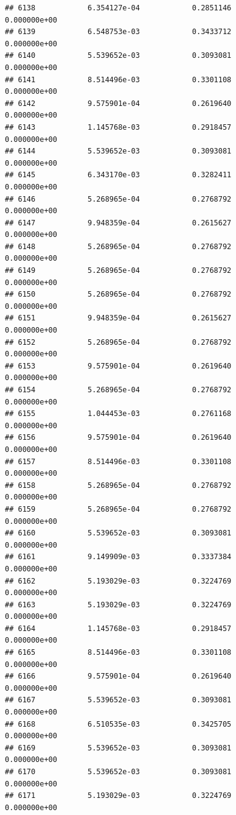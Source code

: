 \documentclass[
]{article}
\begin{document}
\begin{verbatim}
## 6138            6.354127e-04            0.2851146            0.000000e+00
## 6139            6.548753e-03            0.3433712            0.000000e+00
## 6140            5.539652e-03            0.3093081            0.000000e+00
## 6141            8.514496e-03            0.3301108            0.000000e+00
## 6142            9.575901e-04            0.2619640            0.000000e+00
## 6143            1.145768e-03            0.2918457            0.000000e+00
## 6144            5.539652e-03            0.3093081            0.000000e+00
## 6145            6.343170e-03            0.3282411            0.000000e+00
## 6146            5.268965e-04            0.2768792            0.000000e+00
## 6147            9.948359e-04            0.2615627            0.000000e+00
## 6148            5.268965e-04            0.2768792            0.000000e+00
## 6149            5.268965e-04            0.2768792            0.000000e+00
## 6150            5.268965e-04            0.2768792            0.000000e+00
## 6151            9.948359e-04            0.2615627            0.000000e+00
## 6152            5.268965e-04            0.2768792            0.000000e+00
## 6153            9.575901e-04            0.2619640            0.000000e+00
## 6154            5.268965e-04            0.2768792            0.000000e+00
## 6155            1.044453e-03            0.2761168            0.000000e+00
## 6156            9.575901e-04            0.2619640            0.000000e+00
## 6157            8.514496e-03            0.3301108            0.000000e+00
## 6158            5.268965e-04            0.2768792            0.000000e+00
## 6159            5.268965e-04            0.2768792            0.000000e+00
## 6160            5.539652e-03            0.3093081            0.000000e+00
## 6161            9.149909e-03            0.3337384            0.000000e+00
## 6162            5.193029e-03            0.3224769            0.000000e+00
## 6163            5.193029e-03            0.3224769            0.000000e+00
## 6164            1.145768e-03            0.2918457            0.000000e+00
## 6165            8.514496e-03            0.3301108            0.000000e+00
## 6166            9.575901e-04            0.2619640            0.000000e+00
## 6167            5.539652e-03            0.3093081            0.000000e+00
## 6168            6.510535e-03            0.3425705            0.000000e+00
## 6169            5.539652e-03            0.3093081            0.000000e+00
## 6170            5.539652e-03            0.3093081            0.000000e+00
## 6171            5.193029e-03            0.3224769            0.000000e+00

\end{verbatim}
\end{document}

